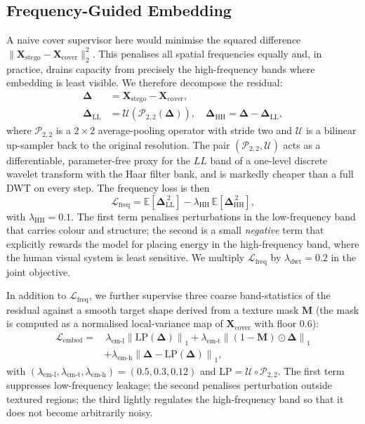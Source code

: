 \documentclass[runningheads]{llncs}
\begin{document}
\subsection{Frequency-Guided Embedding}
\label{sec:freq}
A naive cover supervisor here would minimise the squared difference $\|\mathbf{X}_{\text{stego}}-\mathbf{X}_{\text{cover}}\|_2^2$. This penalises all spatial frequencies equally and, in practice, drains capacity from precisely the high-frequency bands where embedding is least visible. We therefore decompose the residual:
\begin{align}
    \boldsymbol{\Delta} &= \mathbf{X}_{\text{stego}}-\mathbf{X}_{\text{cover}}, \\
    \boldsymbol{\Delta}_{\text{LL}} &= \mathcal{U}\!\left(\mathcal{P}_{2,2}(\boldsymbol{\Delta})\right), \quad
    \boldsymbol{\Delta}_{\text{HH}} = \boldsymbol{\Delta}-\boldsymbol{\Delta}_{\text{LL}},
\end{align}
where $\mathcal{P}_{2,2}$ is a $2\!\times\!2$ average-pooling operator with stride two and $\mathcal{U}$ is a bilinear up-sampler back to the original resolution. The pair $(\mathcal{P}_{2,2},\mathcal{U})$ acts as a differentiable, parameter-free proxy for the $LL$ band of a one-level discrete wavelet transform with the Haar filter bank, and is markedly cheaper than a full DWT on every step. The frequency loss is then
\begin{equation}
    \mathcal{L}_{\text{freq}} = \mathbb{E}\!\left[\boldsymbol{\Delta}_{\text{LL}}^{\,2}\right] - \lambda_{\text{HH}}\,\mathbb{E}\!\left[\boldsymbol{\Delta}_{\text{HH}}^{\,2}\right],
    \label{eq:freq}
\end{equation}
with $\lambda_{\text{HH}}\!=\!0.1$. The first term penalises perturbations in the low-frequency band that carries colour and structure; the second is a small \emph{negative} term that explicitly rewards the model for placing energy in the high-frequency band, where the human visual system is least sensitive. We multiply $\mathcal{L}_{\text{freq}}$ by $\lambda_{\text{dwt}}\!=\!0.2$ in the joint objective.

In addition to $\mathcal{L}_{\text{freq}}$, we further supervise three coarse band-statistics of the residual against a smooth target shape derived from a texture mask $\mathbf{M}$ (the mask is computed as a normalised local-variance map of $\mathbf{X}_{\text{cover}}$ with floor $0.6$):
\begin{align}
    \mathcal{L}_{\text{embed}} = & \,\lambda_{\text{em-l}}\!\left\|\mathrm{LP}(\boldsymbol{\Delta})\right\|_1
    + \lambda_{\text{em-t}}\!\left\|(1-\mathbf{M})\odot\boldsymbol{\Delta}\right\|_1 \nonumber\\
    & + \lambda_{\text{em-h}}\!\left\|\boldsymbol{\Delta}-\mathrm{LP}(\boldsymbol{\Delta})\right\|_1,
    \label{eq:embed}
\end{align}
with $(\lambda_{\text{em-l}},\lambda_{\text{em-t}},\lambda_{\text{em-h}})=(0.5,0.3,0.12)$ and $\mathrm{LP}=\mathcal{U}\circ\mathcal{P}_{2,2}$. The first term suppresses low-frequency leakage; the second penalises perturbation outside textured regions; the third lightly regulates the high-frequency band so that it does not become arbitrarily noisy.
\end{document}
